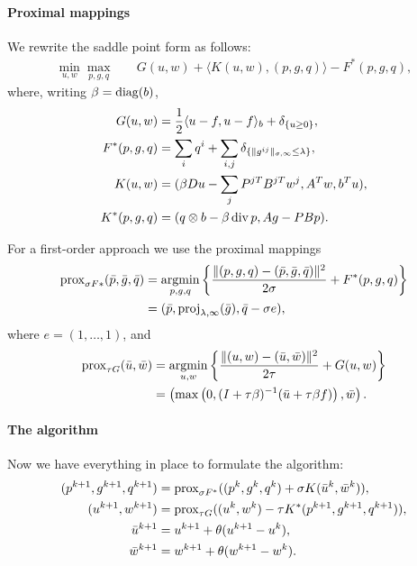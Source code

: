 \paragraph{Proximal mappings}

We rewrite the saddle point form as follows:
\begin{align*}
    \min_{u,w} \max_{p,g,q} \quad
        & G(u,w) + \langle K(u,w), (p,g,q) \rangle - F^*(p,g,q),
\end{align*}
where, writing $\beta = \operatorname{diag}(b)$,
\begin{align*}
    G(u,w) &= \frac{1}{2} \langle u-f, u-f \rangle_b
        + \delta_{\{u \geq 0\}}, \\
    F^*(p,g,q) &= \sum_{i} q^i 
        + \sum_{i,j} \delta_{\{\|g^{ij}\|_{\sigma,\infty} \leq \lambda\}}, \\
    K(u,w) &= (\beta Du - \sum_j P^{jT}B^{jT}w^{j}, A^T w, b^T u), \\
    K^*(p,g,q) &= (q \otimes b - \beta \operatorname{div}{p}, A g - PBp).
\end{align*}

For a first-order approach we use the proximal mappings
\begin{align*}
    \Prox_{\sigma F*}(\bar{p},\bar{g},\bar{q})
    &= \argmin_{p,g,q} \left\{
        \frac{\|(p,g,q)-(\bar{p},\bar{g},\bar{q})\|^2}{2\sigma} + F^*(p,g,q)
    \right\} \\
    &= (\bar{p},\proj_{\lambda,\infty}(\bar{g}),\bar{q}-\sigma e),
\end{align*}
where $e = (1,\dots,1)$, and
\begin{align*}
    \Prox_{\tau G}(\bar{u},\bar{w})
    &= \argmin_{u,w} \left\{
        \frac{\|(u,w)-(\bar{u},\bar{w})\|^2}{2\tau} + G(u,w)
    \right\} \\
    &= \left(
        \max\left(0,(I+\tau \beta)^{-1}(\bar{u} + \tau \beta f)\right),
        \bar{w}
    \right).
\end{align*}

\paragraph{The algorithm}

Now we have everything in place to formulate the algorithm:
\begin{align*}
    (p^{k+1},g^{k+1},q^{k+1}) &= \operatorname{prox}_{\sigma F^*}(
        (p^{k},g^{k},q^{k}) + \sigma K(\bar{u}^{k},\bar{w}^{k})
    ), \\
    (u^{k+1},w^{k+1}) &= \operatorname{prox}_{\tau G}(
        (u^{k},w^{k})-\tau K^*(p^{k+1},g^{k+1},q^{k+1})
    ), \\
    \bar{u}^{k+1} &= u^{k+1} + \theta(u^{k+1}-u^{k}), \\
    \bar{w}^{k+1} &= w^{k+1} + \theta(w^{k+1}-w^{k}).
\end{align*}

